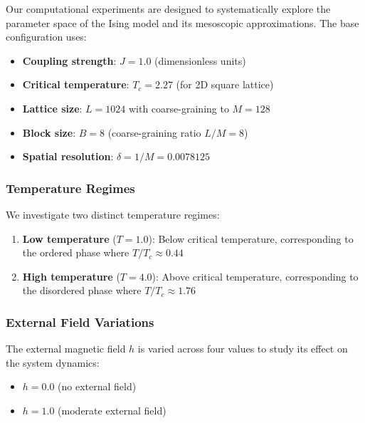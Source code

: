 \documentclass[11pt,a4paper]{article}
\begin{document}
Our computational experiments are designed to systematically explore the parameter space of the Ising model and its mesoscopic approximations. The base configuration uses:

\begin{itemize}
    \item \textbf{Coupling strength}: $J = 1.0$ (dimensionless units)
    \item \textbf{Critical temperature}: $T_c = 2.27$ (for 2D square lattice)
    \item \textbf{Lattice size}: $L = 1024$ with coarse-graining to $M = 128$
    \item \textbf{Block size}: $B = 8$ (coarse-graining ratio $L/M = 8$)
    \item \textbf{Spatial resolution}: $\delta = 1/M = 0.0078125$
\end{itemize}

\subsubsection{Temperature Regimes}

We investigate two distinct temperature regimes:

\begin{enumerate}
    \item \textbf{Low temperature} ($T = 1.0$): Below critical temperature, corresponding to the ordered phase where $T/T_c \approx 0.44$
    \item \textbf{High temperature} ($T = 4.0$): Above critical temperature, corresponding to the disordered phase where $T/T_c \approx 1.76$
\end{enumerate}

\subsubsection{External Field Variations}

The external magnetic field $h$ is varied across four values to study its effect on the system dynamics:

\begin{itemize}
    \item $h = 0.0$ (no external field)
    \item $h = 1.0$ (moderate external field)
\end{itemize}
\end{document}
